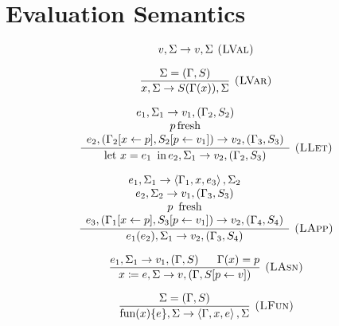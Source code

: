 \section{Evaluation Semantics}
\label{sec:evaluation_semantics}

\begin{figure}
{\footnotesize{}}%
\begin{minipage}[t]{0.59\columnwidth}%
{\footnotesize{}
\[
v,\Sigma\rightarrow v,\Sigma\textsc{ (LVal)}
\]
}{\footnotesize \par}

{\footnotesize{}
\[
\frac{\Sigma=(\Gamma,S)}{x,\Sigma\rightarrow S(\Gamma(x)),\Sigma}\textsc{ (LVar)}
\]
}{\footnotesize \par}

{\footnotesize{}
\[
\frac{\begin{array}[t]{c}
e_{1},\Sigma_{1}\rightarrow v_{1},(\Gamma_{2},S_{2})\\
p\,\mbox{fresh}\\
e_{2},(\Gamma_{2}[x\leftarrow p],S_{2}[p\leftarrow v_{1}])\rightarrow v_{2},(\Gamma_{3},S_{3})
\end{array}}{\mbox{let \ensuremath{x=e_{1}}\,\ in\,\ensuremath{e_{2}}},\Sigma_{1}\rightarrow v_{2},(\Gamma_{2},S_{3})}\textsc{ (LLet)}
\]
}{\footnotesize \par}

{\footnotesize{}
\[
\frac{\begin{array}[t]{c}
e_{1},\Sigma_{1}\rightarrow\left\langle \Gamma_{1},x,e_{3}\right\rangle ,\Sigma_{2}\\
e_{2},\Sigma_{2}\rightarrow v_{1},(\Gamma_{3},S_{3})\\
\mbox{\ensuremath{p}\,\ fresh}\\
e_{3},(\Gamma_{1}[x\leftarrow p],S_{3}[p\leftarrow v_{1}])\rightarrow v_{2},(\Gamma_{4},S_{4})
\end{array}}{e_{1}(e_{2}),\Sigma_{1}\rightarrow v_{2},(\Gamma_{3},S_{4})}\textsc{ (LApp)}
\]
}{\footnotesize \par}

{\footnotesize{}
\[
\frac{e_{1},\Sigma_{1}\rightarrow v_{1},(\Gamma,S)\,\,\,\,\,\,\,\,\,\,\Gamma(x)=p}{x\coloneqq e,\Sigma\rightarrow v,(\Gamma,S[p\leftarrow v])}\textsc{ (LAsn)}
\]
}{\footnotesize \par}

{\footnotesize{}
\[
\frac{\Sigma=(\Gamma,S)}{\mbox{fun(\ensuremath{x})\{\ensuremath{e}\}},\Sigma\rightarrow\left\langle \Gamma,x,e\right\rangle ,\Sigma}\textsc{ (LFun)}
\]
}{\footnotesize \par}


\end{minipage}
\end{figure}

